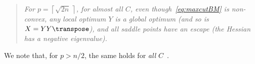 \documentclass{article}
\newcommand{\1}{\mathbf{1}}
\begin{document}



\begin{quote}
	\emph{For $p = \left\lceil\sqrt{2n}\,\right\rceil$, for almost all $C$, even though~\eqref{eq:maxcutBM} is non-convex,
	any local optimum $Y$ is a global optimum (and so is $X=YY\transpose$), and all saddle points have an escape (the Hessian has a negative eigenvalue).
	}
\end{quote}
%
We note that, for $p>n/2$, the same holds for \emph{all} $C$~\citep{boumal2015staircase}.
\end{document}
